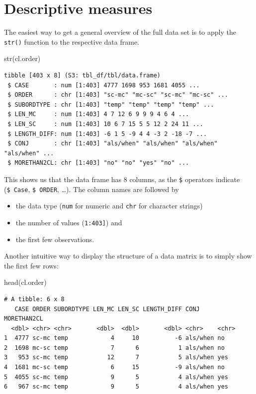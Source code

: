\documentclass[
  11pt,
  letterpaper,
  DIV=11,
  numbers=noendperiod]{scrreprt}
\newenvironment{Shaded}{\begin{snugshade}}{\end{snugshade}}
\newcommand{\FunctionTok}[1]{\textcolor[rgb]{0.28,0.35,0.67}{#1}}
\newcommand{\NormalTok}[1]{\textcolor[rgb]{0.00,0.23,0.31}{#1}}
\begin{document}
\section{Descriptive measures}\label{descriptive-measures}

The easiest way to get a general overview of the full data set is to
apply the \texttt{str()} function to the respective data frame.

\begin{Shaded}
\begin{Highlighting}[]
\FunctionTok{str}\NormalTok{(cl.order)}
\end{Highlighting}
\end{Shaded}

\begin{verbatim}
tibble [403 x 8] (S3: tbl_df/tbl/data.frame)
 $ CASE       : num [1:403] 4777 1698 953 1681 4055 ...
 $ ORDER      : chr [1:403] "sc-mc" "mc-sc" "sc-mc" "mc-sc" ...
 $ SUBORDTYPE : chr [1:403] "temp" "temp" "temp" "temp" ...
 $ LEN_MC     : num [1:403] 4 7 12 6 9 9 9 4 6 4 ...
 $ LEN_SC     : num [1:403] 10 6 7 15 5 5 12 2 24 11 ...
 $ LENGTH_DIFF: num [1:403] -6 1 5 -9 4 4 -3 2 -18 -7 ...
 $ CONJ       : chr [1:403] "als/when" "als/when" "als/when" "als/when" ...
 $ MORETHAN2CL: chr [1:403] "no" "no" "yes" "no" ...
\end{verbatim}

This shows us that the data frame has 8 columns, as the \texttt{\$}
operators indicate (\texttt{\$\ Case}, \texttt{\$\ ORDER}, \ldots). The
column names are followed by

\begin{itemize}
\item
  the data type (\texttt{num} for numeric and \texttt{chr} for character
  strings)
\item
  the number of values
  (\texttt{\textasciigrave{}{[}1:403{]}\textasciigrave{}}) and
\item
  the first few observations.
\end{itemize}

Another intuitive way to display the structure of a data matrix is to
simply show the first few rows:

\begin{Shaded}
\begin{Highlighting}[]
\FunctionTok{head}\NormalTok{(cl.order)}
\end{Highlighting}
\end{Shaded}

\begin{verbatim}
# A tibble: 6 x 8
   CASE ORDER SUBORDTYPE LEN_MC LEN_SC LENGTH_DIFF CONJ     MORETHAN2CL
  <dbl> <chr> <chr>       <dbl>  <dbl>       <dbl> <chr>    <chr>      
1  4777 sc-mc temp            4     10          -6 als/when no         
2  1698 mc-sc temp            7      6           1 als/when no         
3   953 sc-mc temp           12      7           5 als/when yes        
4  1681 mc-sc temp            6     15          -9 als/when no         
5  4055 sc-mc temp            9      5           4 als/when yes        
6   967 sc-mc temp            9      5           4 als/when yes        
\end{verbatim}
\end{document}

